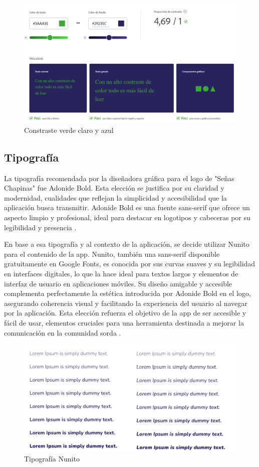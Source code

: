 \begin{itemize}
    \begin{figure} [H]
        \centering
        \includegraphics[width=0.6\linewidth]{figuras/contraste_verde_claro_azul.png}
        \caption{Constraste verde claro y azul}
        \label{fig:enter-label}
    \end{figure}
        

\end{itemize}



\subsection{Tipografía}

La tipografía recomendada por la diseñadora gráfica para el logo de "Señas Chapinas" fue Adonide Bold. Esta elección se justifica por su claridad y modernidad, cualidades que reflejan la simplicidad y accesibilidad que la aplicación busca transmitir. Adonide Bold es una fuente sans-serif que ofrece un aspecto limpio y profesional, ideal para destacar en logotipos y cabeceras por su legibilidad y presencia  \cite{GraphiqueSF}.

En base a esa tipografía y al contexto de la aplicación, se decide utilizar Nunito para el contenido de la app. Nunito, también una sans-serif disponible gratuitamente en Google Fonts, es conocida por sus curvas suaves y su legibilidad en interfaces digitales, lo que la hace ideal para textos largos y elementos de interfaz de usuario en aplicaciones móviles. Su diseño amigable y accesible complementa perfectamente la estética introducida por Adonide Bold en el logo, asegurando coherencia visual y facilitando la experiencia del usuario al navegar por la aplicación. Esta elección refuerza el objetivo de la app de ser accesible y fácil de usar, elementos cruciales para una herramienta destinada a mejorar la comunicación en la comunidad sorda \cite{Design2024}.

\begin{figure} [H]
    \centering
    \includegraphics[width=0.75\linewidth]{figuras/tipografia.png}
    \caption{Tipografía Nunito}
    \label{fig:enter-label}
\end{figure}

